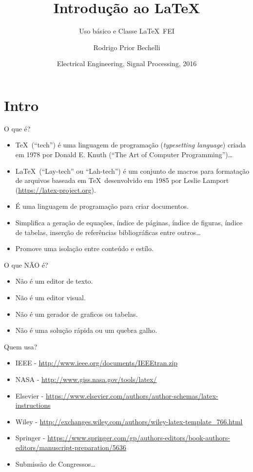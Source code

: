 \documentclass{beamer}
\title{Introdução ao \LaTeX}
\subtitle{Uso básico e Classe \LaTeX~FEI}
\author{Rodrigo Prior Bechelli}
\institute{Centro Universitário da FEI}
\date[SP 2016] %
{Electrical Engineering, Signal Processing, 2016}
\begin{document}
\begin{frame}
    \titlepage
\end{frame}


\section{Intro}


\begin{frame}{O que é?}
    \begin{itemize}
        \item \TeX~(``tech'') é uma linguagem de programação (\emph{typesetting language}) criada em 1978 por Donald E. Knuth (``The Art of Computer Programming'')\dots
        \item \LaTeX~(``Lay-tech'' ou ``Lah-tech'') é um conjunto de macros para formatação de arquivos baseada em \TeX~desenvolvido em 1985 por Leslie Lamport (\url{https://latex-project.org}).
        \item É uma linguagem de programação para criar documentos.
        \item Simplifica a geração de equações, índice de páginas, índice de figuras, índice de tabelas, inserção de referências bibliográficas entre outros\dots
        \item Promove uma isolação entre conteúdo e estílo.
    \end{itemize}
\end{frame}


\begin{frame}{O que NÃO é?}
    \begin{itemize}
        \item Não é um editor de texto.
        \item Não é um editor visual.
        \item Não é um gerador de graficos ou tabelas.
        \item Não é uma solução rápida ou um quebra galho.
    \end{itemize}
\end{frame}


\begin{frame}{Quem usa?}
    \begin{itemize}
        \item IEEE - \url{http://www.ieee.org/documents/IEEEtran.zip}
        \item NASA - \url{http://www.giss.nasa.gov/tools/latex/}
        \item Elsevier - \url{https://www.elsevier.com/authors/author-schemas/latex-instructions}
        \item Wiley - \url{http://exchanges.wiley.com/authors/wiley-latex-template_766.html}
        \item Springer - \url{https://www.springer.com/gp/authors-editors/book-authors-editors/manuscript-preparation/5636}
        \item Submissão de Congressos\dots
    \end{itemize}
\end{frame}
\end{document}

